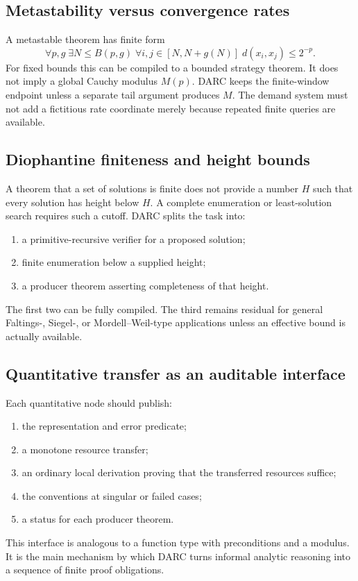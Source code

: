 \subsection{Metastability versus convergence rates}

A metastable theorem has finite form
\[
  \forall p,g\;\exists N\le B(p,g)\;
  \forall i,j\in[N,N+g(N)]\;d(x_i,x_j)\le 2^{-p}.
\]
For fixed bounds this can be compiled to a bounded strategy theorem.  It does
not imply a global Cauchy modulus \(M(p)\).  DARC keeps the finite-window
endpoint unless a separate tail argument produces \(M\).  The demand system
must not add a fictitious rate coordinate merely because repeated finite
queries are available.

\subsection{Diophantine finiteness and height bounds}

A theorem that a set of solutions is finite does not provide a number \(H\)
such that every solution has height below \(H\).  A complete enumeration or
least-solution search requires such a cutoff.  DARC splits the task into:
\begin{enumerate}
  \item a primitive-recursive verifier for a proposed solution;
  \item finite enumeration below a supplied height;
  \item a producer theorem asserting completeness of that height.
\end{enumerate}
The first two can be fully compiled.  The third remains residual for general
Faltings-, Siegel-, or Mordell--Weil-type applications unless an effective
bound is actually available.

\subsection{Quantitative transfer as an auditable interface}

Each quantitative node should publish:
\begin{enumerate}
  \item the representation and error predicate;
  \item a monotone resource transfer;
  \item an ordinary local derivation proving that the transferred resources
        suffice;
  \item the conventions at singular or failed cases;
  \item a status for each producer theorem.
\end{enumerate}
This interface is analogous to a function type with preconditions and a
modulus.  It is the main mechanism by which DARC turns informal analytic
reasoning into a sequence of finite proof obligations.
